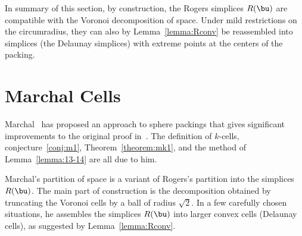 In summary of this section, by construction, the Rogers simplices
$R(\bu)$ are compatible with the Voronoi decomposition of space.
Under mild restrictions on the circumradius, they can also by
Lemma~\ref{lemma:Rconv} be reassembled into simplices (the Delaunay
simplices) with extreme points at the centers of the packing.
%
%




\section{Marchal Cells}



Marchal~\cite{marchal:2009} has proposed an approach to sphere
packings that gives significant improvements to the original proof
in~\cite{Hales:2006:DCG}.  The definition of $k$-cells,
conjecture~\ref{conj:m1}, Theorem~\ref{theorem:mk1}, and the method of
Lemma~\ref{lemma:13-14} are all due to him.  
%


Marchal's partition of space is a variant of Rogers's partition into
the simplices $R(\bu)$.  The main part of construction is the
decomposition obtained by truncating the Voronoi cells by a ball of
radius $\sqrt2$.  In a few carefully chosen situations, he assembles
the simplices $R(\bu)$ into larger convex cells (Delaunay cells), as
suggested by Lemma~\ref{lemma:Rconv}.




